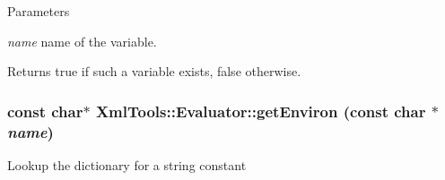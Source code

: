 \begin{DoxyParams}{Parameters}
\item[{\em name}]name of the variable. \end{DoxyParams}
\begin{DoxyReturn}{Returns}
true if such a variable exists, false otherwise. 
\end{DoxyReturn}
\hypertarget{class_xml_tools_1_1_evaluator_a3b19ba699533cdb3517c3929f9c479ae}{
\subsubsection[{getEnviron}]{\setlength{\rightskip}{0pt plus 5cm}const char$\ast$ XmlTools::Evaluator::getEnviron (const char $\ast$ {\em name})}}
\label{class_xml_tools_1_1_evaluator_a3b19ba699533cdb3517c3929f9c479ae}
Lookup the dictionary for a string constant


